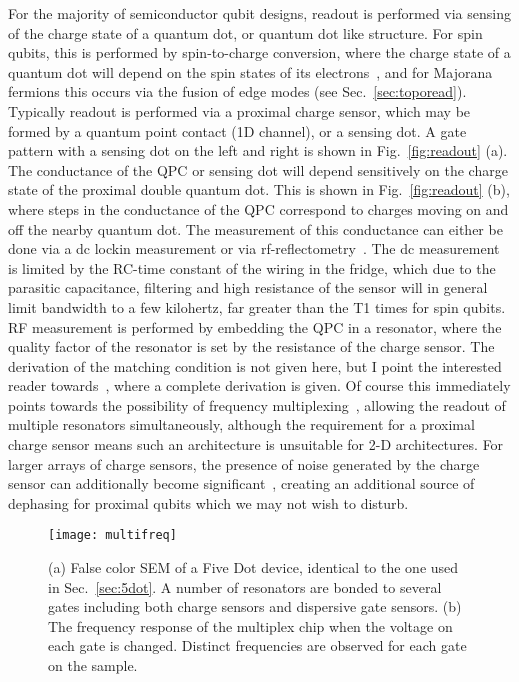 For the majority of semiconductor qubit designs, readout is performed via sensing of the charge state of a quantum dot, or quantum dot like
structure. For spin qubits, this is performed by spin-to-charge conversion, where the charge state of a quantum dot will depend on the spin states
of its electrons~\cite{nature02693,PhysRevB.98.125404}, and for Majorana fermions this occurs via the fusion of edge modes (see Sec.~\ref{sec:toporead}).
Typically readout is performed via a proximal charge sensor, which may be formed by a quantum point contact (1D channel), or a sensing dot. A gate pattern
with a sensing dot on the left and right is shown in Fig.~\ref{fig:readout} (a). The conductance of the QPC or sensing dot will depend sensitively
on the charge state of the proximal double quantum dot. This is shown in Fig.~\ref{fig:readout} (b), where steps in the conductance of the QPC correspond to
charges moving on and off the nearby quantum dot. The measurement of this conductance can either be done via a dc lockin measurement or via
rf-reflectometry~\cite{Reilly:2007ig}. The dc measurement is limited by the RC-time constant of the wiring in the fridge, which due to the parasitic
capacitance, filtering and high resistance of the sensor will in general limit bandwidth to a few kilohertz, far greater than the T1 times for spin qubits.
RF measurement is performed by embedding the QPC in a resonator, where the quality factor of the resonator is set by the resistance of the charge sensor.
The derivation of the matching condition is not given here, but I point the interested reader towards~\cite{crootthesis}, where a complete derivation is given.
Of course this immediately points towards the possibility of frequency multiplexing~\cite{doi:10.1063/1.4868107}, allowing the readout of multiple
resonators simultaneously, although the requirement for a proximal charge sensor means such an architecture is unsuitable for 2-D architectures. For larger
arrays of charge sensors, the presence of noise generated by the charge sensor can additionally become significant~\cite{PhysRevB.78.035324}, creating
an additional source of dephasing for proximal qubits which we may not wish to disturb.

\begin{figure}
  \texttt{[image: multifreq]}
  \caption[Frequency multiplexed readout of a five-dot device]
  {\label{fig:multifreq}(a) False color SEM of a Five Dot device, identical to the one used in Sec.~\ref{sec:5dot}. A number of resonators are bonded to several gates
  including both charge sensors and dispersive gate sensors. (b) The frequency response of the multiplex chip when the voltage on each gate is changed. Distinct frequencies
  are observed for each gate on the sample.}
\end{figure}

